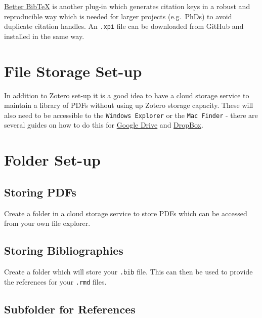 \documentclass[]{book}
\begin{document}
\href{https://github.com/retorquere/zotero-better-bibtex/releases/tag/v5.1.76}{Better BibTeX} is another plug-in which generates citation keys in a robust and reproducible way which is needed for larger projects (e.g.~PhDs) to avoid duplicate citation handles. An \texttt{.xpi} file can be downloaded from GitHub and installed in the same way.

\hypertarget{file-storage-set-up}{%
\section{File Storage Set-up}\label{file-storage-set-up}}

In addition to Zotero set-up it is a good idea to have a cloud storage service to maintain a library of PDFs without using up Zotero storage capacity. These will also need to be accessible to the \texttt{Windows\ Explorer} or the \texttt{Mac\ Finder} - there are several guides on how to do this for \href{https://www.howtogeek.com/228989/how-to-use-the-desktop-google-drive-app/}{Google Drive} and \href{https://www.dropboxforum.com/t5/Installation-and-desktop-app/How-do-I-put-Dropbox-on-my-File-Explorer-in-Win-10/td-p/313031}{DropBox}.

\hypertarget{folder-set-up}{%
\section{Folder Set-up}\label{folder-set-up}}

\hypertarget{storing-pdfs}{%
\subsection{Storing PDFs}\label{storing-pdfs}}

Create a folder in a cloud storage service to store PDFs which can be accessed from your own file explorer.

\hypertarget{storing-bibliographies}{%
\subsection{Storing Bibliographies}\label{storing-bibliographies}}

Create a folder which will store your \texttt{.bib} file. This can then be used to provide the references for your \texttt{.rmd} files.

\hypertarget{subfolder-for-references}{%
\subsection{Subfolder for References}\label{subfolder-for-references}}
\end{document}
